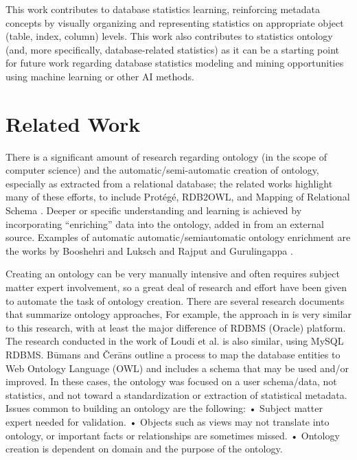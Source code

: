 \documentclass[sigconf]{acmart}
\begin{document}
This work contributes to database statistics learning, reinforcing metadata concepts by visually organizing and representing statistics on appropriate object (table, index, column) levels. This work also contributes to statistics ontology (and, more specifically, database-related statistics) as it can be a starting point for future work regarding database statistics modeling and mining opportunities using machine learning or other AI methods.

\section{Related Work}
There is a significant amount of research regarding ontology (in the scope of computer
science) and the automatic/semi-automatic creation of ontology, especially as extracted from a
relational database; the related works highlight many of these efforts, to include Protégé,
RDB2OWL, and Mapping of Relational Schema \cite{christian2017mapping}. Deeper or specific understanding and learning is achieved by incorporating “enriching” data into the ontology, added in from an external source. Examples of automatic
automatic/semiautomatic ontology enrichment are the works by Booshehri and Luksch \cite{booshehri2015ontology}
and Rajput and Gurulingappa \cite{rajput2013semi}.

Creating an ontology can be very manually intensive and often requires subject matter
expert involvement, so a great deal of research and effort have been given to automate the task of ontology creation. There are several research documents that summarize ontology approaches, For example, the approach in \cite{christian2017mapping} is very similar to this research, with at least the major difference of RDBMS (Oracle) platform. The research conducted in the work of Loudi et al. \cite{louhdi2013hybrid} is also similar, using MySQL RDBMS. Būmans and Čerāns \cite{bumans2018rdb2owl} outline a process to map the database entities to Web Ontology Language (OWL) and includes a schema that may be used and/or improved. In these cases, the ontology was focused on a user schema/data, not statistics, and not toward a standardization or extraction of statistical metadata. Issues common to building an ontology are the following:
• Subject matter expert needed for validation.
• Objects such as views may not translate into ontology, or important facts or
relationships are sometimes missed.
• Ontology creation is dependent on domain and the purpose of the ontology.
\end{document}
